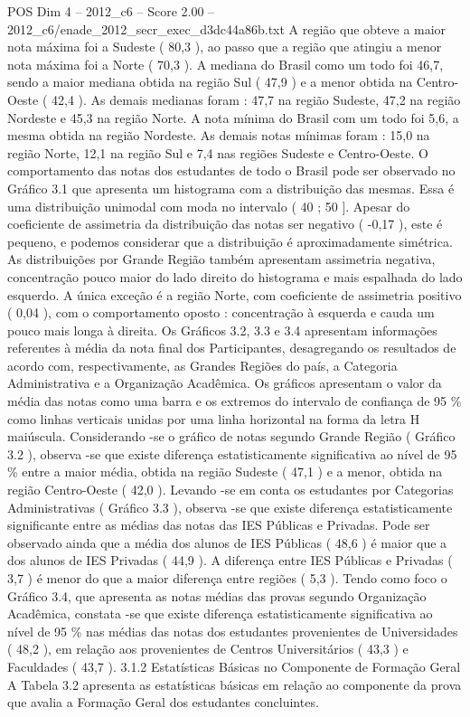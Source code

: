 \begin{textsample}{POS Dim 4 – 2012\_c6 – Score 2.00 – 2012\_c6/enade\_2012\_secr\_exec\_d3dc44a86b.txt}
A região que obteve a maior nota máxima foi a Sudeste ( 80,3 ), ao passo que a região que atingiu a menor nota máxima foi a Norte ( 70,3 ).
A mediana do Brasil como um todo foi 46,7, sendo a maior mediana obtida na região Sul ( 47,9 ) e a menor obtida na Centro-Oeste ( 42,4 ).
As demais medianas foram : 47,7 na região Sudeste, 47,2 na região Nordeste e 45,3 na região Norte.
A nota mínima do Brasil com um todo foi 5,6, a mesma obtida na região Nordeste.
As demais notas mínimas foram : 15,0 na região Norte, 12,1 na região Sul e 7,4 nas regiões Sudeste e Centro-Oeste.
O comportamento das notas dos estudantes de todo o Brasil pode ser observado no Gráfico 3.1 que apresenta um histograma com a distribuição das mesmas.
Essa é uma distribuição unimodal com moda no intervalo ( 40 ; 50 ].
Apesar do coeficiente de assimetria da distribuição das notas ser negativo ( -0,17 ), este é pequeno, e podemos considerar que a distribuição é aproximadamente simétrica.
As distribuições por Grande Região também apresentam assimetria negativa, concentração pouco maior do lado direito do histograma e mais espalhada do lado esquerdo.
A única exceção é a região Norte, com coeficiente de assimetria positivo ( 0,04 ), com o comportamento oposto : concentração à esquerda e cauda um pouco mais longa à direita.
Os Gráficos 3.2, 3.3 e 3.4 apresentam informações referentes à média da nota final dos Participantes, desagregando os resultados de acordo com, respectivamente, as Grandes Regiões do país, a Categoria Administrativa e a Organização Acadêmica.
Os gráficos apresentam o valor da média das notas como uma barra e os extremos do intervalo de confiança de 95 \% como linhas verticais unidas por uma linha horizontal na forma da letra H maiúscula.
Considerando -se o gráfico de notas segundo Grande Região ( Gráfico 3.2 ), observa -se que existe diferença estatisticamente significativa ao nível de 95 \% entre a maior média, obtida na região Sudeste ( 47,1 ) e a menor, obtida na região Centro-Oeste ( 42,0 ).
Levando -se em conta os estudantes por Categorias Administrativas ( Gráfico 3.3 ), observa -se que existe diferença estatisticamente significante entre as médias das notas das IES Públicas e Privadas.
Pode ser observado ainda que a média dos alunos de IES Públicas ( 48,6 ) é maior que a dos alunos de IES Privadas ( 44,9 ).
A diferença entre IES Públicas e Privadas ( 3,7 ) é menor do que a maior diferença entre regiões ( 5,3 ).
Tendo como foco o Gráfico 3.4, que apresenta as notas médias das provas segundo Organização Acadêmica, constata -se que existe diferença estatisticamente significativa ao nível de 95 \% nas médias das notas dos estudantes provenientes de Universidades ( 48,2 ), em relação aos provenientes de Centros Universitários ( 43,3 ) e Faculdades ( 43,7 ). 3.1.2 Estatísticas Básicas no Componente de Formação Geral A Tabela 3.2 apresenta as estatísticas básicas em relação ao componente da prova que avalia a Formação Geral dos estudantes concluintes.

\end{textsample}
